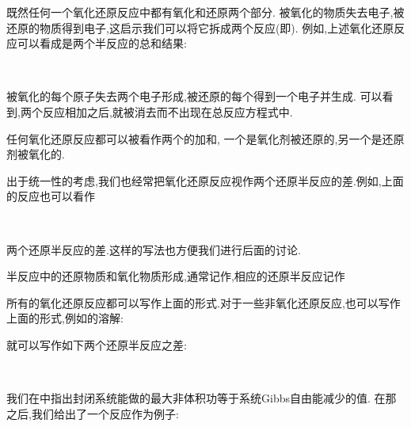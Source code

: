 \documentclass{ctexart}
\begin{document}
既然任何一个氧化还原反应中都有氧化和还原两个部分.%
被氧化的物质失去电子,被还原的物质得到电子,这启示我们可以将它拆成两个反应(即).
例如,上述氧化还原反应可以看成是两个半反应的总和结果:
\begin{tightcenter}
    \\
\end{tightcenter}
被氧化的每个原子失去两个电子形成,被还原的每个得到一个电子并生成.%
可以看到,两个反应相加之后,就被消去而不出现在总反应方程式中.
\begin{definition}[6B.1.2 半反应]
    任何氧化还原反应都可以被看作两个的加和,%
    一个是氧化剂被还原的,另一个是还原剂被氧化的.
\end{definition}
出于统一性的考虑,我们也经常把氧化还原反应视作两个还原半反应的差.例如,上面的反应也可以看作
\begin{tightcenter}
    \\
\end{tightcenter}
两个还原半反应的差.这样的写法也方便我们进行后面的讨论.
\begin{definition}[6B.1.3 氧化还原对]
    半反应中的还原物质和氧化物质\footnotemark 形成,通常记作,相应的还原半反应记作
    \begin{tightcenter}
    \end{tightcenter}

\end{definition}
所有的氧化还原反应都可以写作上面的形式.对于一些非氧化还原反应,也可以写作上面的形式,例如的溶解:
\begin{tightcenter}
\end{tightcenter}
就可以写作如下两个还原半反应之差:
\begin{tightcenter}
    \\
\end{tightcenter}
\vspace{8pt}
\indent 我们在中指出封闭系统能做的最大非体积功等于系统Gibbs自由能减少的值.%
在那之后,我们给出了一个反应作为例子:
\begin{tightcenter}
\end{tightcenter}
\end{document}
